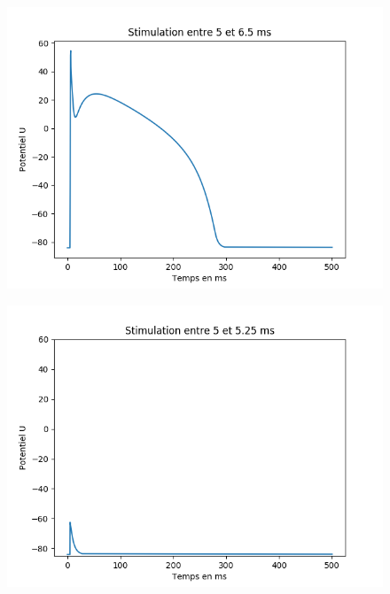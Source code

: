 \documentclass[a4paper,12pt,twoside]{report}
\begin{document}
\begin{figure}
	\centering
	\includegraphics[scale=0.5]{./u(t).png}
\end{figure}

\begin{figure}
	\centering
	\includegraphics[scale=0.5]{./u(t)_2.png}
\end{figure}
\end{document}
